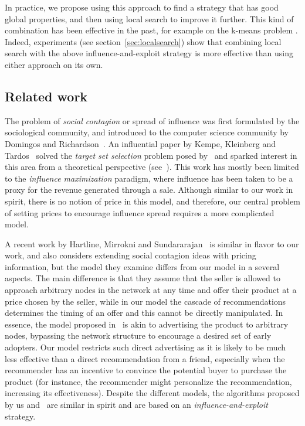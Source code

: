\documentclass[letterpaper,twoside]{article}
\begin{document}
In practice, we propose using this approach to find a strategy that has good
global properties, and then using local search to improve it further. This kind of combination has
been effective in the past, for example on the k-means problem \cite{AV07}. Indeed, experiments
(see section~\ref{sec:localsearch}) show that combining local search with the above influence-and-exploit
strategy is more effective than using either approach on its own.


\subsection{Related work}
The problem of {\em social contagion} or spread of influence was first
formulated by the sociological community, and introduced to the computer
science community by Domingos and Richardson~\cite{DR01}. An influential
paper by Kempe, Kleinberg and Tardos~\cite{KKT03} solved the {\em target set
  selection} problem posed by~\cite{DR01} and sparked interest in this area
from a theoretical perspective (see~\cite{Kleinberg_AGT07}). This work has
mostly been limited to the {\em influence maximization} paradigm, where
influence has been taken to be a proxy for the revenue generated through a
sale. Although similar to our work in spirit, there is no notion of price in this
model, and therefore, our central problem of setting prices to encourage influence
spread requires a more complicated model.

A recent work by Hartline, Mirrokni and Sundararajan~\cite{HMS08} is similar
in flavor to our work, and also considers extending social contagion ideas
with pricing information, but the model they examine differs from our model
in a several aspects. The main difference is that they assume that the seller
is allowed to approach arbitrary nodes in the network at any time and offer
their product at a price chosen by the seller, while in our model the cascade
of recommendations determines the timing of an offer and this cannot be
directly manipulated. In essence, the model proposed in~\cite{HMS08} is akin
to advertising the product to arbitrary nodes, bypassing the network
structure to encourage a desired set of early adopters. Our model restricts
such direct advertising as it is likely to be much less effective than a
direct recommendation from a friend, especially when the recommender has an
incentive to convince the potential buyer to purchase the product (for
instance, the recommender might personalize the recommendation, increasing
its effectiveness). Despite the different models, the algorithms proposed by
us and~\cite{HMS08} are similar in spirit and are based on an {\em
  influence-and-exploit} strategy.
\end{document}
